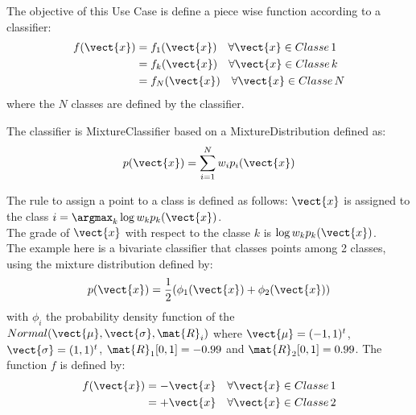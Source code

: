 \renewcommand{\filename}{docUC_LSF_ExpertMixture.tex}
\renewcommand{\filetitle}{UC : Defining a piece wise function according to a classifier}

\HeaderIIILevel


\label{ExpertMixture}



The objective of this Use Case is define a piece wise function according to a classifier:
\begin{eqnarray}\label{expMixtFct}
  f(\vect{x})  & = f_1(\vect{x}) \quad \forall \vect{x} \in Classe\, 1 \\ \nonumber
  & = f_k(\vect{x}) \quad \forall \vect{x} \in Classe\, k  \\\nonumber
  & = f_N(\vect{x}) \quad \forall \vect{x} \in Classe\, N
\end{eqnarray}
where the $N$ classes are defined by the  classifier.



The classifier is MixtureClassifier based on a  MixtureDistribution defined as:
\begin{equation}\label{MixtDist}
  p(\vect{x}) = \sum_{i=1}^N w_ip_i(\vect{x})
\end{equation}

The rule to assign a point to a class is defined as follows:  $\vect{x}$ is assigned to the class $i=\argmax_k \log w_kp_k(\vect{x})$.\\
The grade of $\vect{x}$ with respect to the classe $k$ is $\log w_kp_k(\vect{x})$.\\

The example here is a bivariate classifier that classes points among 2 classes, using the mixture distribution defined by:
\begin{equation}\label{MixtDist}
  p(\vect{x}) = \frac{1}{2}(\phi_1(\vect{x}) + \phi_2(\vect{x}))
\end{equation}
with $\phi_i$ the probability density function of the $Normal(\vect{\mu}, \vect{\sigma}, \mat{R}_i)$ where $\vect{\mu}=(-1, 1)^t$, $\vect{\sigma}=(1, 1)^t$, $\mat{R}_1[0,1]=-0.99$ and $\mat{R}_2[0,1]=0.99$.
The  function $f$ is defined by:
\begin{eqnarray}\label{expMixtFctEx}
  f(\vect{x})  & = -\vect{x} \quad \forall \vect{x} \in Classe\, 1 \\ \nonumber
  & = +\vect{x} \quad \forall \vect{x} \in Classe\, 2
\end{eqnarray}

